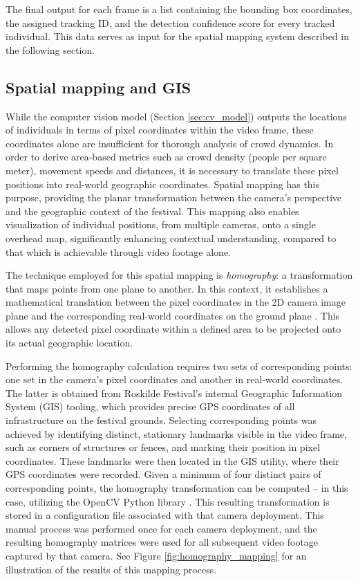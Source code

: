 The final output for each frame is a list containing the bounding box coordinates, the assigned tracking ID, and the detection confidence score for every tracked individual. This data serves as input for the spatial mapping system described in the following section.

\subsection{Spatial mapping and GIS}
\label{sec:spatial_mapping}

While the computer vision model (Section \ref{sec:cv_model}) outputs the locations of individuals in terms of pixel coordinates within the video frame, these coordinates alone are insufficient for thorough analysis of crowd dynamics. In order to derive area-based metrics such as crowd density (people per square meter), movement speeds and distances, it is necessary to translate these pixel positions into real-world geographic coordinates. Spatial mapping has this purpose, providing the planar transformation between the camera's perspective and the geographic context of the festival. This mapping also enables visualization of individual positions, from multiple cameras, onto a single overhead map, significantly enhancing contextual understanding, compared to that which is achievable through video footage alone.

The technique employed for this spatial mapping is \textit{homography}: a transformation that maps points from one plane to another. In this context, it establishes a mathematical translation between the pixel coordinates in the 2D camera image plane and the corresponding real-world coordinates on the ground plane \cite{homography}. This allows any detected pixel coordinate within a defined area to be projected onto its actual geographic location.

Performing the homography calculation requires two sets of corresponding points: one set in the camera's pixel coordinates and another in real-world coordinates. The latter is obtained from Roskilde Festival's internal Geographic Information System (GIS) tooling, which provides precise GPS coordinates of all infrastructure on the festival grounds. Selecting corresponding points was achieved by identifying distinct, stationary landmarks visible in the video frame, such as corners of structures or fences, and marking their position in pixel coordinates. These landmarks were then located in the GIS utility, where their GPS coordinates were recorded. Given a minimum of four distinct pairs of corresponding points, the homography transformation can be computed -- in this case, utilizing the OpenCV Python library \cite{opencv}. This resulting transformation is stored in a configuration file associated with that camera deployment. This manual process was performed once for each camera deployment, and the resulting homography matrices were used for all subsequent video footage captured by that camera. See Figure \ref{fig:homography_mapping} for an illustration of the results of this mapping process.

